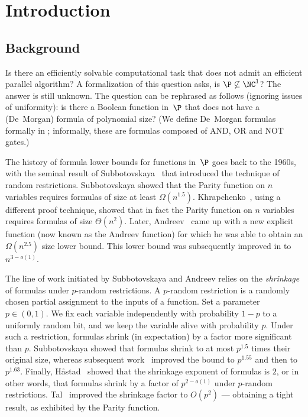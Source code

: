 \documentclass{toc}
\begin{document}
%
%
%

\section{Introduction}

\subsection{Background}

%
%
%
%
%
Is there an efficiently solvable computational task
that does not admit an efficient parallel algorithm?  %
%
%
A formalization of this question asks,  %
is $\P\not\subseteq\NC^{1}$? The answer
%
is still unknown. The question can be rephrased as follows (ignoring issues of uniformity): 
is there a
Boolean  %
function in~$\P$ that does not have a (De~Morgan) formula of
polynomial size?   %
%
%
%
(We define De~Morgan formulas formally in ; informally, these are formulas composed of AND, OR and NOT gates.)

The history of formula lower bounds for functions in~$\P$ goes back
to the 1960s, with the seminal result of Subbotovskaya~\cite{S61}
that introduced the technique of random restrictions. Subbotovskaya
showed that the Parity function on $n$ variables requires formulas
of size at least $\Omega(n^{1.5})$. Khrapchenko~\cite{K72}, using
a different proof technique, showed that in fact the Parity function
on $n$ variables requires formulas of size $\Theta(n^{2})$. Later,
Andreev~\cite{A87} came up with a new explicit function (now known
as the Andreev function) for which he was able to obtain an $\Omega(n^{2.5})$
size lower bound. This lower bound was subsequently improved
%
%
in  %
\cite{IN93,PZ93,H98,T14}
to $n^{3-o(1)}$.

The line of work initiated by Subbotovskaya and Andreev relies on
the \emph{shrinkage} of formulas under $p$-random restrictions. A
$p$-random restriction is a randomly chosen partial assignment to
the inputs of a function. Set a parameter $p\in(0,1)$. We fix each
variable independently with probability $1-p$ to a uniformly random
bit, and we keep the variable alive with probability $p$. Under such
a restriction, formulas shrink (in expectation) by a factor more significant
than $p$. Subbotovskaya showed that formulas shrink to
at most $p^{1.5}$ times their original size, whereas subsequent
%
work~\cite{PZ93,IN93}  %
improved the bound to $p^{1.55}$ and
then to  %
$p^{1.63}$.
%
%
%
%
Finally, H{\aa}stad~\cite{H98} showed that the shrinkage
exponent of formulas is $2$, or in other words, that 
formulas shrink by a factor of $p^{2-o(1)}$ under $p$-random restrictions.
Tal~\cite{T14} improved the shrinkage factor to $O(p^{2})$ ---
obtaining a tight result, as exhibited by the Parity function.
\end{document}
